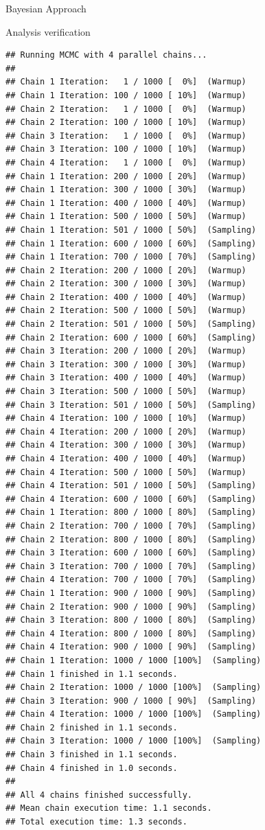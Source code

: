 \documentclass[
  ignorenonframetext,
]{beamer}
\begin{document}
\begin{frame}[fragile]{Bayesian Approach}
\begin{block}{Analysis verification}
\begin{verbatim}
## Running MCMC with 4 parallel chains...
## 
## Chain 1 Iteration:   1 / 1000 [  0%]  (Warmup) 
## Chain 1 Iteration: 100 / 1000 [ 10%]  (Warmup) 
## Chain 2 Iteration:   1 / 1000 [  0%]  (Warmup) 
## Chain 2 Iteration: 100 / 1000 [ 10%]  (Warmup) 
## Chain 3 Iteration:   1 / 1000 [  0%]  (Warmup) 
## Chain 3 Iteration: 100 / 1000 [ 10%]  (Warmup) 
## Chain 4 Iteration:   1 / 1000 [  0%]  (Warmup) 
## Chain 1 Iteration: 200 / 1000 [ 20%]  (Warmup) 
## Chain 1 Iteration: 300 / 1000 [ 30%]  (Warmup) 
## Chain 1 Iteration: 400 / 1000 [ 40%]  (Warmup) 
## Chain 1 Iteration: 500 / 1000 [ 50%]  (Warmup) 
## Chain 1 Iteration: 501 / 1000 [ 50%]  (Sampling) 
## Chain 1 Iteration: 600 / 1000 [ 60%]  (Sampling) 
## Chain 1 Iteration: 700 / 1000 [ 70%]  (Sampling) 
## Chain 2 Iteration: 200 / 1000 [ 20%]  (Warmup) 
## Chain 2 Iteration: 300 / 1000 [ 30%]  (Warmup) 
## Chain 2 Iteration: 400 / 1000 [ 40%]  (Warmup) 
## Chain 2 Iteration: 500 / 1000 [ 50%]  (Warmup) 
## Chain 2 Iteration: 501 / 1000 [ 50%]  (Sampling) 
## Chain 2 Iteration: 600 / 1000 [ 60%]  (Sampling) 
## Chain 3 Iteration: 200 / 1000 [ 20%]  (Warmup) 
## Chain 3 Iteration: 300 / 1000 [ 30%]  (Warmup) 
## Chain 3 Iteration: 400 / 1000 [ 40%]  (Warmup) 
## Chain 3 Iteration: 500 / 1000 [ 50%]  (Warmup) 
## Chain 3 Iteration: 501 / 1000 [ 50%]  (Sampling) 
## Chain 4 Iteration: 100 / 1000 [ 10%]  (Warmup) 
## Chain 4 Iteration: 200 / 1000 [ 20%]  (Warmup) 
## Chain 4 Iteration: 300 / 1000 [ 30%]  (Warmup) 
## Chain 4 Iteration: 400 / 1000 [ 40%]  (Warmup) 
## Chain 4 Iteration: 500 / 1000 [ 50%]  (Warmup) 
## Chain 4 Iteration: 501 / 1000 [ 50%]  (Sampling) 
## Chain 4 Iteration: 600 / 1000 [ 60%]  (Sampling) 
## Chain 1 Iteration: 800 / 1000 [ 80%]  (Sampling) 
## Chain 2 Iteration: 700 / 1000 [ 70%]  (Sampling) 
## Chain 2 Iteration: 800 / 1000 [ 80%]  (Sampling) 
## Chain 3 Iteration: 600 / 1000 [ 60%]  (Sampling) 
## Chain 3 Iteration: 700 / 1000 [ 70%]  (Sampling) 
## Chain 4 Iteration: 700 / 1000 [ 70%]  (Sampling) 
## Chain 1 Iteration: 900 / 1000 [ 90%]  (Sampling) 
## Chain 2 Iteration: 900 / 1000 [ 90%]  (Sampling) 
## Chain 3 Iteration: 800 / 1000 [ 80%]  (Sampling) 
## Chain 4 Iteration: 800 / 1000 [ 80%]  (Sampling) 
## Chain 4 Iteration: 900 / 1000 [ 90%]  (Sampling) 
## Chain 1 Iteration: 1000 / 1000 [100%]  (Sampling) 
## Chain 1 finished in 1.1 seconds.
## Chain 2 Iteration: 1000 / 1000 [100%]  (Sampling) 
## Chain 3 Iteration: 900 / 1000 [ 90%]  (Sampling) 
## Chain 4 Iteration: 1000 / 1000 [100%]  (Sampling) 
## Chain 2 finished in 1.1 seconds.
## Chain 3 Iteration: 1000 / 1000 [100%]  (Sampling) 
## Chain 3 finished in 1.1 seconds.
## Chain 4 finished in 1.0 seconds.
## 
## All 4 chains finished successfully.
## Mean chain execution time: 1.1 seconds.
## Total execution time: 1.3 seconds.
\end{verbatim}


\end{block}
\end{frame}
\end{document}
